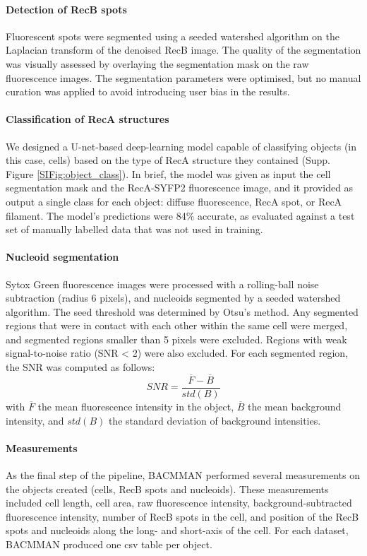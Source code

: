 \paragraph*{Detection of RecB spots}
Fluorescent spots were seg\-men\-ted using a seeded watershed algorithm on the Laplacian transform of the denoised RecB image. The quality of the segmentation was visually assessed by overlaying the segmentation mask on the raw fluorescence images. The segmentation parameters were optimised, but no manual curation was applied to avoid introducing user bias in the results.

\paragraph*{Classification of RecA structures}
We designed a U-net-based deep-learning model capable of classifying objects (in this case, cells) based on the type of RecA structure they contained (Supp. Figure \ref{SIFig:object_class}). In brief, the model was given as input the cell segmentation mask and the RecA-SYFP2 fluorescence image, and it provided as output a single class for each object: diffuse fluorescence, RecA spot, or RecA filament. The model's predictions were 84\% accurate, as evaluated against a test set of manually labelled data that was not used in training.

\paragraph*{Nucleoid segmentation}
Sytox Green fluorescence images were processed with a rolling-ball noise subtraction (radius 6 pixels), and nucleoids segmented by a seeded watershed algorithm. The seed threshold was determined by Otsu's method\cite{Otsu1979}. Any segmented regions that were in contact with each other within the same cell were merged, and segmented regions smaller than 5 pixels were excluded. Regions with weak signal-to-noise ratio (SNR < 2) were also excluded. For each segmented region, the SNR was computed as follows:
\begin{equation}
    SNR = \dfrac{\overline{F}-\overline{B}}{std(B)}
\end{equation}
with $\overline{F}$ the mean fluorescence intensity in the object, $\overline{B}$ the mean background intensity, and $std(B)$ the standard deviation of background intensities.

\paragraph*{Measurements}
As the final step of the pipeline, BACMMAN performed several measurements on the objects created (cells, RecB spots and nucleoids). These measurements included cell length, cell area, raw fluorescence intensity, background-subtracted fluorescence intensity, number of RecB spots in the cell, and position of the RecB spots and nucleoids along the long- and short-axis of the cell. For each dataset, BACMMAN produced one csv table per object.

